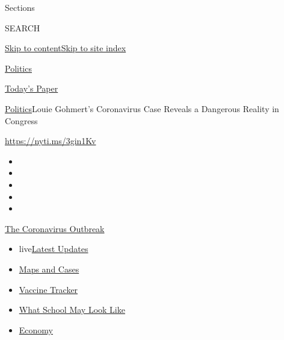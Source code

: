 Sections

SEARCH

\protect\hyperlink{site-content}{Skip to
content}\protect\hyperlink{site-index}{Skip to site index}

\href{https://www.nytimes.com/section/politics}{Politics}

\href{https://myaccount.nytimes.com/auth/login?response_type=cookie\&client_id=vi}{}

\href{https://www.nytimes.com/section/todayspaper}{Today's Paper}

\href{/section/politics}{Politics}\textbar{}Louie Gohmert's Coronavirus
Case Reveals a Dangerous Reality in Congress

\url{https://nyti.ms/3gin1Kv}

\begin{itemize}
\item
\item
\item
\item
\item
\end{itemize}

\href{https://www.nytimes.com/news-event/coronavirus?action=click\&pgtype=Article\&state=default\&region=TOP_BANNER\&context=storylines_menu}{The
Coronavirus Outbreak}

\begin{itemize}
\tightlist
\item
  live\href{https://www.nytimes.com/2020/08/01/world/coronavirus-covid-19.html?action=click\&pgtype=Article\&state=default\&region=TOP_BANNER\&context=storylines_menu}{Latest
  Updates}
\item
  \href{https://www.nytimes.com/interactive/2020/us/coronavirus-us-cases.html?action=click\&pgtype=Article\&state=default\&region=TOP_BANNER\&context=storylines_menu}{Maps
  and Cases}
\item
  \href{https://www.nytimes.com/interactive/2020/science/coronavirus-vaccine-tracker.html?action=click\&pgtype=Article\&state=default\&region=TOP_BANNER\&context=storylines_menu}{Vaccine
  Tracker}
\item
  \href{https://www.nytimes.com/interactive/2020/07/29/us/schools-reopening-coronavirus.html?action=click\&pgtype=Article\&state=default\&region=TOP_BANNER\&context=storylines_menu}{What
  School May Look Like}
\item
  \href{https://www.nytimes.com/live/2020/07/31/business/stock-market-today-coronavirus?action=click\&pgtype=Article\&state=default\&region=TOP_BANNER\&context=storylines_menu}{Economy}
\end{itemize}

